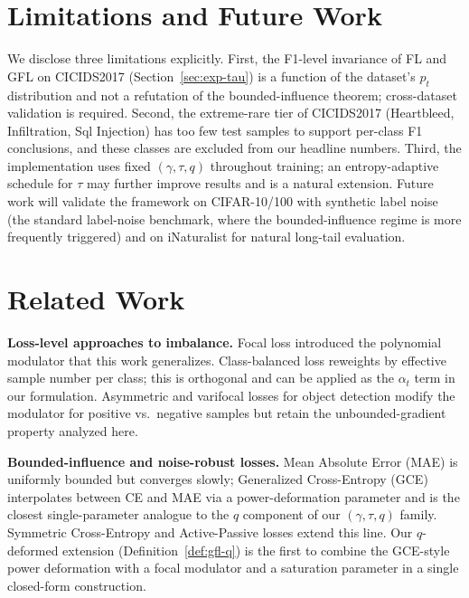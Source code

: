 \documentclass[conference]{IEEEtran}
\theoremstyle{definition}
\begin{document}
\section{Limitations and Future Work}
\label{sec:limitations}

We disclose three limitations explicitly. First, the F1-level invariance of FL and GFL on CICIDS2017 (Section~\ref{sec:exp-tau}) is a function of the dataset's $p_t$ distribution and not a refutation of the bounded-influence theorem; cross-dataset validation is required. Second, the extreme-rare tier of CICIDS2017 (Heartbleed, Infiltration, Sql Injection) has too few test samples to support per-class F1 conclusions, and these classes are excluded from our headline numbers. Third, the implementation uses fixed $(\gamma, \tau, q)$ throughout training; an entropy-adaptive schedule for $\tau$ may further improve results and is a natural extension. Future work will validate the framework on CIFAR-10/100 with synthetic label noise (the standard label-noise benchmark, where the bounded-influence regime is more frequently triggered) and on iNaturalist for natural long-tail evaluation.

\section{Related Work}
\label{sec:related}

\textbf{Loss-level approaches to imbalance.} Focal loss \cite{lin2017focal} introduced the polynomial modulator that this work generalizes. Class-balanced loss \cite{cui2019class} reweights by effective sample number per class; this is orthogonal and can be applied as the $\alpha_t$ term in our formulation. Asymmetric and varifocal losses for object detection \cite{zhang2021varifocal} modify the modulator for positive vs.\ negative samples but retain the unbounded-gradient property analyzed here.

\textbf{Bounded-influence and noise-robust losses.} Mean Absolute Error (MAE) is uniformly bounded but converges slowly; Generalized Cross-Entropy (GCE) \cite{zhang2018generalized} interpolates between CE and MAE via a power-deformation parameter and is the closest single-parameter analogue to the $q$ component of our $(\gamma, \tau, q)$ family. Symmetric Cross-Entropy and Active-Passive losses extend this line. Our $q$-deformed extension (Definition~\ref{def:gfl-q}) is the first to combine the GCE-style power deformation with a focal modulator and a saturation parameter in a single closed-form construction.
\end{document}
